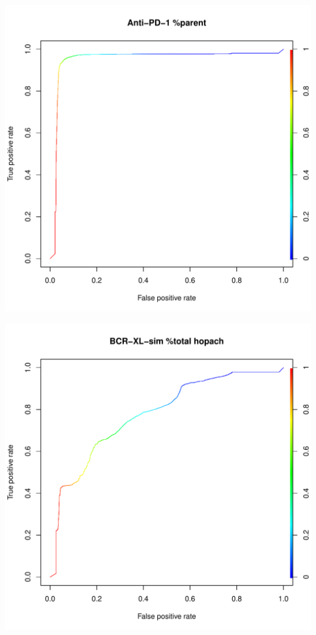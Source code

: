 \documentclass[11pt,a4paper,twoside]{report}\usepackage[]{graphicx}\usepackage[]{color}
\makeatletter
\def\maxwidth{ %
  \ifdim\Gin@nat@width>\linewidth
    \linewidth
  \else
    \Gin@nat@width
  \fi
}
\newenvironment{knitrout}{}{} %
\makeatother
\begin{document}
\begin{knitrout}
\includegraphics[width=\maxwidth]{figure/fig_code-3} 

\includegraphics[width=\maxwidth]{figure/fig_code-4} 


\end{knitrout}
\end{document}
